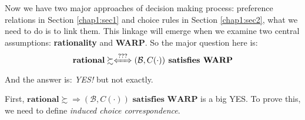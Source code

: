 Now we have two major approaches of decision making process: preference relations in Section \ref{chap1:sec1} and choice rules in Section \ref{chap1:sec2},
what we need to do is to link them. This linkage will emerge when we examine two central assumptions: \textbf{rationality} and \textbf{WARP}. So the major question here is: 
$$\textbf{rational}\succsim\xLeftrightarrow{???} (\mathcal{B},C(\cdot))\textbf{ satisfies WARP}$$
And the answer is: \textit{YES!} but not exactly.

First, $\textbf{rational}\succsim \Rightarrow (\mathcal{B},C(\cdot))\textbf{ satisfies WARP}$ is a big YES. To prove this, we need to define \textit{induced choice correspondence}.